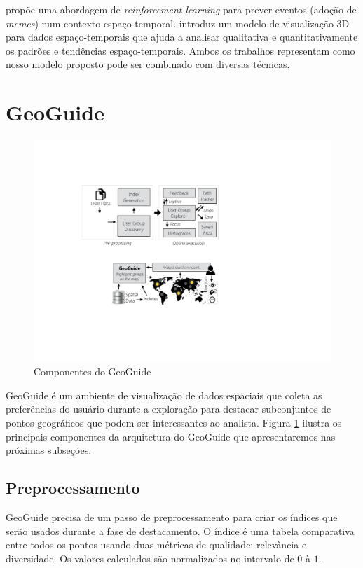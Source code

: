  propõe uma abordagem de {\em reinforcement learning} para prever eventos (adoção de {\em memes}) num contexto espaço-temporal.  introduz um modelo de visualização 3D para dados espaço-temporais que ajuda a analisar qualitativa e quantitativamente os padrões e tendências espaço-temporais. Ambos os trabalhos representam como nosso modelo proposto pode ser combinado com diversas técnicas.

\section{GeoGuide}

\begin{figure}[t]
	\centering
	\includegraphics[width=\columnwidth]{imagens/framework}
	\caption{Componentes do GeoGuide}
	\label{fig:framework}
	\vspace{-10pt}
\end{figure}

GeoGuide  \cite{omidvarTehrani2017} é um ambiente de visualização de dados espaciais que coleta as preferências do usuário durante a exploração para destacar subconjuntos de pontos geográficos que podem ser interessantes ao analista. Figura \ref{fig:framework} ilustra os principais componentes da arquitetura do GeoGuide que apresentaremos nas próximas subseções.

\subsection{Preprocessamento}

GeoGuide precisa de um passo de preprocessamento para criar os índices que serão usados durante a fase de destacamento. O índice é uma tabela comparativa entre todos os pontos usando duas métricas de qualidade: relevância e diversidade. Os valores calculados são normalizados no intervalo de $0$ à $1$.

